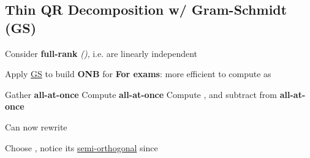 \subsection*{Thin QR Decomposition w/ Gram-Schmidt (GS)}


Consider \textbf{full-rank}
\emph{()},
i.e. 
are linearly independent

\begin{itemize}

      \vItem
            Apply \underline{GS} 
            to build \textbf{ONB}
            for 
      \vItem
            \textbf{For exams}: more efficient to compute as

            \begin{enumerate}
                  \vItem
                        Gather
                        \textbf{all-at-once}
                  \vItem
                        Compute
                        \textbf{all-at-once}
                  \vItem
                        Compute , and
                        subtract from  \textbf{all-at-once}
            \end{enumerate}
      \vItem
            Can now rewrite
\end{itemize}

\hSep %

Choose
,
notice its \underline{semi-orthogonal} since

